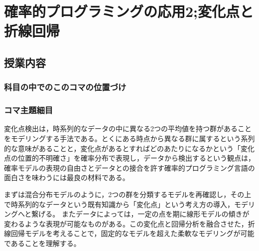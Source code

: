 \section{確率的プログラミングの応用2;変化点と折線回帰}
\subsection{授業内容}
\subsubsection{科目の中でのこのコマの位置づけ}
\subsubsection{コマ主題細目}
変化点検出は，時系列的なデータの中に異なる2つの平均値を持つ群があることをモデリングする手法である。とくにある時点から異なる群に属するという系列的な意味があることと，変化点があるとすればどのあたりになるかという「変化点の位置的不明確さ」を確率分布で表現し，データから検出するという観点は，確率モデルの表現の自由さとデータとの接合を許す確率的プログラミング言語の面白さを味わうには最良の材料である。

まずは混合分布モデルのように，2つの群を分類するモデルを再確認し，その上で時系列的なデータという既有知識から「変化点」という考え方の導入，モデリングへと繋げる。
またデータによっては，一定の点を期に線形モデルの傾きが変わるような表現が可能なものがある。この変化点と回帰分析を融合させた，折線回帰モデルを考えることで，固定的なモデルを超えた柔軟なモデリングが可能であることを理解する。

